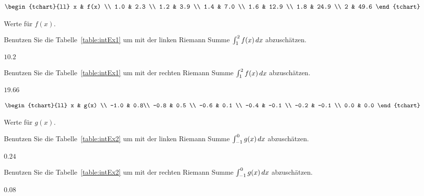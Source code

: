 \begin{exercises}

\begin{margintable}[1in]
\[
\begin{tchart}{ll}
x & f(x) \\
1.0 & 2.3 \\
1.2 & 3.9 \\ 
1.4 & 7.0 \\
1.6 & 12.9 \\
1.8 & 24.9 \\ 
2 & 49.6 
\end{tchart}
\]
\caption{Werte für $f(x)$.}
\label{table:intEx1}
\end{margintable}

\begin{exercise}
Benutzen Sie die Tabelle~\ref{table:intEx1} um mit der linken Riemann Summe 
 $\int_1^2 f(x) \, d x$ abzuschätzen.
\begin{answer}
$10.2$
\end{answer}
\end{exercise}

\begin{exercise}
Benutzen Sie die Tabelle~\ref{table:intEx1} um mit der rechten Riemann Summe 
 $\int_1^2 f(x) \, d x$ abzuschätzen.
\begin{answer}
$19.66$
\end{answer}
\end{exercise}

\begin{margintable}[1in]
\[
\begin{tchart}{ll}
x & g(x) \\
-1.0 & 0.8\\
-0.8 & 0.5 \\ 
-0.6 & 0.1 \\
-0.4 & -0.1 \\
-0.2 & -0.1 \\ 
0.0 &  0.0 
\end{tchart}
\]
\caption{Werte für $g(x)$.}
\label{table:intEx2}
\end{margintable}


\begin{exercise}
Benutzen Sie die Tabelle~\ref{table:intEx2}  um mit der linken Riemann Summe 
$\int_{-1}^0 g(x) \, d x$ abzuschätzen.
\begin{answer}
$0.24$
\end{answer}
\end{exercise}

\begin{exercise}
Benutzen Sie die Tabelle~\ref{table:intEx2}  um mit der rechten Riemann Summe 
$\int_{-1}^0 g(x) \, d x$ abzuschätzen.
\begin{answer}
$0.08$
\end{answer}
\end{exercise}


\end{exercises}
